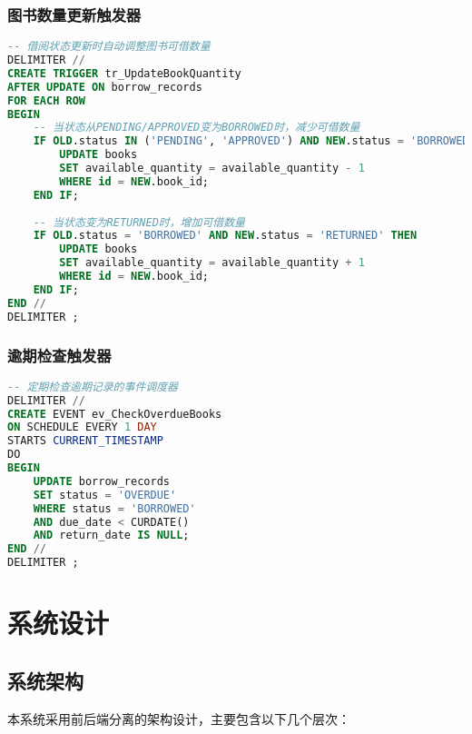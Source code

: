 \documentclass[12pt,a4paper]{article}
\begin{document}
\subsubsection{图书数量更新触发器}
\begin{lstlisting}[language=sql]
-- 借阅状态更新时自动调整图书可借数量
DELIMITER //
CREATE TRIGGER tr_UpdateBookQuantity
AFTER UPDATE ON borrow_records
FOR EACH ROW
BEGIN
    -- 当状态从PENDING/APPROVED变为BORROWED时，减少可借数量
    IF OLD.status IN ('PENDING', 'APPROVED') AND NEW.status = 'BORROWED' THEN
        UPDATE books 
        SET available_quantity = available_quantity - 1 
        WHERE id = NEW.book_id;
    END IF;
    
    -- 当状态变为RETURNED时，增加可借数量
    IF OLD.status = 'BORROWED' AND NEW.status = 'RETURNED' THEN
        UPDATE books 
        SET available_quantity = available_quantity + 1 
        WHERE id = NEW.book_id;
    END IF;
END //
DELIMITER ;
\end{lstlisting}

\subsubsection{逾期检查触发器}
\begin{lstlisting}[language=sql]
-- 定期检查逾期记录的事件调度器
DELIMITER //
CREATE EVENT ev_CheckOverdueBooks
ON SCHEDULE EVERY 1 DAY
STARTS CURRENT_TIMESTAMP
DO
BEGIN
    UPDATE borrow_records 
    SET status = 'OVERDUE'
    WHERE status = 'BORROWED' 
    AND due_date < CURDATE()
    AND return_date IS NULL;
END //
DELIMITER ;
\end{lstlisting}

\section{系统设计}

\subsection{系统架构}

本系统采用前后端分离的架构设计，主要包含以下几个层次：
\end{document}
